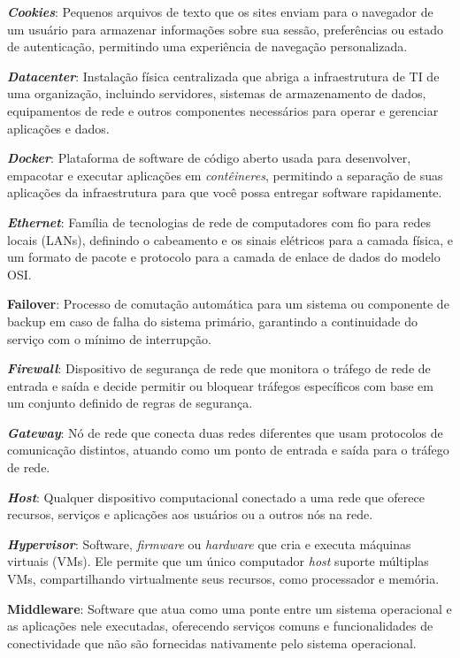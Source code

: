 {\textbf{\textit{Cookies}}: Pequenos arquivos de texto que os sites enviam para o navegador de um usuário para armazenar informações sobre sua sessão, preferências ou estado de autenticação, permitindo uma experiência de navegação personalizada.

\textbf{\textit{Datacenter}}: Instalação física centralizada que abriga a infraestrutura de TI de uma organização, incluindo servidores, sistemas de armazenamento de dados, equipamentos de rede e outros componentes necessários para operar e gerenciar aplicações e dados.

\textbf{\textit{Docker}}: Plataforma de software de código aberto usada para desenvolver, empacotar e executar aplicações em \textit{contêineres}, permitindo a separação de suas aplicações da infraestrutura para que você possa entregar software rapidamente.

\textbf{\textit{Ethernet}}: Família de tecnologias de rede de computadores com fio para redes locais (LANs), definindo o cabeamento e os sinais elétricos para a camada física, e um formato de pacote e protocolo para a camada de enlace de dados do modelo OSI.

\textbf{Failover}: Processo de comutação automática para um sistema ou componente de backup em caso de falha do sistema primário, garantindo a continuidade do serviço com o mínimo de interrupção.

\textbf{\textit{Firewall}}: Dispositivo de segurança de rede que monitora o tráfego de rede de entrada e saída e decide permitir ou bloquear tráfegos específicos com base em um conjunto definido de regras de segurança.

\textbf{\textit{Gateway}}: Nó de rede que conecta duas redes diferentes que usam protocolos de comunicação distintos, atuando como um ponto de entrada e saída para o tráfego de rede.

\textbf{\textit{Host}}: Qualquer dispositivo computacional conectado a uma rede que oferece recursos, serviços e aplicações aos usuários ou a outros nós na rede.

\textbf{\textit{Hypervisor}}: Software, \textit{firmware} ou \textit{hardware} que cria e executa máquinas virtuais (VMs). Ele permite que um único computador \textit{host} suporte múltiplas VMs, compartilhando virtualmente seus recursos, como processador e memória.

\textbf{Middleware}: Software que atua como uma ponte entre um sistema operacional e as aplicações nele executadas, oferecendo serviços comuns e funcionalidades de conectividade que não são fornecidas nativamente pelo sistema operacional.

}
